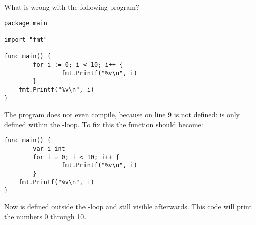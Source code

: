 \begin{Exercise}[title={Scope},difficulty=4]
\label{ex:scope}
\Question\label{ex:scope q1} What is wrong with the following program?

\begin{lstlisting}[numbers=right]
package main

import "fmt"
                                                                                                   
func main() {
        for i := 0; i < 10; i++ {
                fmt.Printf("%v\n", i)
        }
	fmt.Printf("%v\n", i)
}
\end{lstlisting}

\end{Exercise}

\begin{Answer}
\Question
The program does not even compile, because  on line 9 is
not defined:  is only defined within the -loop. To fix
this the function  should become:
\begin{lstlisting}[numbers=none]
func main() {
        var i int
        for i = 0; i < 10; i++ {
                fmt.Printf("%v\n", i)
        }
	fmt.Printf("%v\n", i)
}
\end{lstlisting}
Now  is defined outside the -loop and still visible
afterwards. This code will print the numbers 0 through 10.
\end{Answer}
